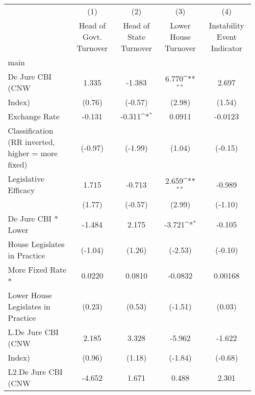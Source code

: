 {
\def\sym#1{\ifmmode^{#1}\else\(^{#1}\)\fi}
\begin{tabular}{l*{4}{c}}
\hline\hline
                    &\multicolumn{1}{c}{(1)}&\multicolumn{1}{c}{(2)}&\multicolumn{1}{c}{(3)}&\multicolumn{1}{c}{(4)}\\
                    &\multicolumn{1}{c}{Head of Govt. Turnover}&\multicolumn{1}{c}{Head of State Turnover}&\multicolumn{1}{c}{Lower House Turnover}&\multicolumn{1}{c}{Instability Event Indicator}\\
\hline
main                &                     &                     &                     &                     \\
De Jure CBI (CNW    &       1.335         &      -1.383         &       6.770\sym{**} &       2.697         \\
Index)              &      (0.76)         &     (-0.57)         &      (2.98)         &      (1.54)         \\
[1em]
Exchange Rate       &      -0.131         &      -0.311\sym{*}  &      0.0911         &     -0.0123         \\
Classification (RR inverted, higher = more fixed)&     (-0.97)         &     (-1.99)         &      (1.04)         &     (-0.15)         \\
[1em]
Legislative Efficacy&       1.715         &      -0.713         &       2.659\sym{**} &      -0.989         \\
                    &      (1.77)         &     (-0.57)         &      (2.99)         &     (-1.10)         \\
[1em]
De Jure CBI * Lower &      -1.484         &       2.175         &      -3.721\sym{*}  &      -0.105         \\
House Legislates in Practice&     (-1.04)         &      (1.26)         &     (-2.53)         &     (-0.10)         \\
[1em]
More Fixed Rate *   &      0.0220         &      0.0810         &     -0.0832         &     0.00168         \\
Lower House Legislates in Practice&      (0.23)         &      (0.53)         &     (-1.51)         &      (0.03)         \\
[1em]
L.De Jure CBI (CNW  &       2.185         &       3.328         &      -5.962         &      -1.622         \\
Index)              &      (0.96)         &      (1.18)         &     (-1.84)         &     (-0.68)         \\
[1em]
L2.De Jure CBI (CNW &      -4.652         &       1.671         &       0.488         &       2.301         \\

\end{tabular}}
